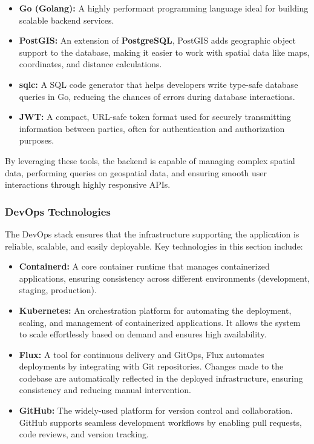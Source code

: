 \begin{itemize}
    \item{} \textbf{Go (Golang):} A highly performant programming language ideal for building scalable backend services.
    \item{} \textbf{PostGIS:}  An extension of \textbf{PostgreSQL}, PostGIS adds geographic object support to the database, making it easier to work with spatial data like maps, coordinates, and distance calculations.
    \item{} \textbf{sqlc:} A SQL code generator that helps developers write type{-}safe database queries in Go, reducing the chances of errors during database interactions.
    \item{} \textbf{JWT:} A compact, URL{-}safe token format used for securely transmitting information between parties, often for authentication and authorization purposes.
\end{itemize}

By leveraging these tools, the backend is capable of managing complex spatial data, performing queries on geospatial data, and ensuring smooth user interactions through highly responsive APIs.

\subsubsection{DevOps Technologies}

The DevOps stack ensures that the infrastructure supporting the application is reliable, scalable, and easily deployable. Key technologies in this section include:

\begin{itemize}
    \item{}  \textbf{Containerd:} A core container runtime that manages containerized applications, ensuring consistency across different environments (development, staging, production).
    \item{} \textbf{Kubernetes:} An orchestration platform for automating the deployment, scaling, and management of containerized applications. It allows the system to scale effortlessly based on demand and ensures high availability.
    \item{} \textbf{Flux:} A tool for continuous delivery and GitOps, Flux automates deployments by integrating with Git repositories. Changes made to the codebase are automatically reflected in the deployed infrastructure, ensuring consistency and reducing manual intervention.
    \item{} \textbf{GitHub:} The widely{-}used platform for version control and collaboration. GitHub supports seamless development workflows by enabling pull requests, code reviews, and version tracking.
\end{itemize}


